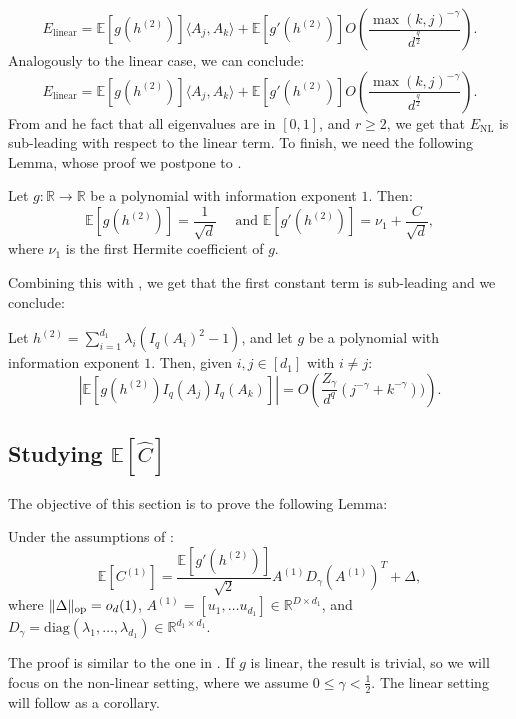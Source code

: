\documentclass[]{article}
\numberwithin{equation}{section}
\theoremstyle{definition}
\newcommand{\RR}{\mathbb{R}}
\newcommand{\EE}{\mathbb{E}}
\def\op{{\rm op}}
\begin{document}
\begin{equation}
    E_\mathrm{linear} = \EE\left[ g(h^{(2)}) \right ] \langle A_j, A_k \rangle + \EE\left[ g'(h^{(2)}) \right ]  O\left ( \dfrac{\max(k,j)^{-\gamma}}{d^{\frac{q}{2}}}\right ).
\end{equation}
Analogously to the linear case, we can conclude: 
\begin{equation}
    E_\mathrm{linear} = \EE[g(h^{(2)})]\langle A_j, A_k \rangle + \EE\left[ g'(h^{(2)}) \right ]  O\left ( \dfrac{\max(k,j)^{-\gamma}}{d^{\frac{q}{2}}}\right ).
\end{equation}
From  and he fact that all eigenvalues are in $[0,1]$, and $ r \geq 2$, we get that $E_\mathrm{NL}$ is sub-leading with respect to the linear term. To finish, we need the following Lemma, whose proof we postpone to . 
\begin{lemma}
    Let $g:\RR \to \RR$ be a polynomial with information exponent $1$. Then:
    \begin{equation}
        \EE[g(h^{(2)})]= \dfrac{1}{\sqrt{d}} \quad \text{ and } \EE \left[ g'(h^{(2)}) \right ] = \nu_{1} + \dfrac{C}{\sqrt{d}},
    \end{equation}
    where $\nu_1$ is the first Hermite coefficient of $g$. 
    \label{lemma:information_exponent_g}
\end{lemma}
Combining this with , we get that the first constant term is sub-leading and we conclude:  
\begin{lemma}
    Let $h^{(2)} = \sum_{i=1}^{d_1} \lambda_i (I_{q}(A_i)^{2} -1)$, and let $g$ be a polynomial with information exponent $1$. Then, given $i, j \in [d_1]$ with $i \not = j$: 
    \[
     \left | \EE \left [ g(h^{(2)}) I_{q}(A_j) I_{q}(A_k)\right ] \right | = O \left ( \dfrac{Z_\gamma}{d^{q}}(j^{-\gamma} + k^{-\gamma}))\right ). 
    \]\label{lemma:non_linear_case_cross_expectations}
\end{lemma}


\subsection{\texorpdfstring{Studying $\EE[\hat{C}]$}{Studying E[C]}}
\label{section:E[C]_proof}
The objective of this section is to prove the following Lemma:  
\begin{lemma}
Under the assumptions of : 
    \[
    \EE \left [C^{(1)} \right ] = \dfrac{\EE\left[ g'(h^{(2)})\right ]}{\sqrt{2}}A^{(1)} D_{\gamma} (A^{(1)})^T + \Delta, 
    \]
    where $\| \Delta \|_\op = o_{d}(1)$,  $A^{(1)} = [u_1, \dots u_{d_1}] \in \mathbb{R}^{D \times d_1}$, and $D_\gamma = \mathrm{diag} ( \lambda_1, \dots, \lambda_{d_1}) \in \RR^{d_1 \times d_1}$. 
    \label{lemma:expectation_C_1_2}
\end{lemma}
The proof is similar to the one in . If $g$ is linear, the result is trivial, so we will focus on the non-linear setting, where we assume $0 \leq \gamma < \frac{1}{2}$. The linear setting will follow as a corollary. 
\end{document}
